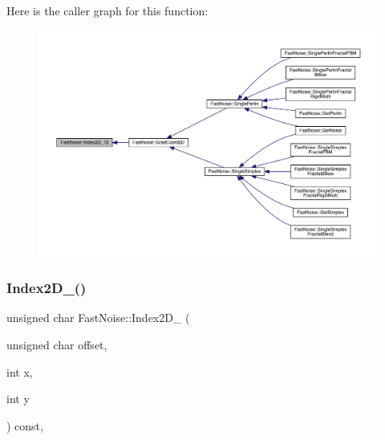 Here is the caller graph for this function\+:
\nopagebreak
\begin{figure}[H]
\begin{center}
\leavevmode
\includegraphics[width=350pt]{class_fast_noise_aa4cae648a6a3817d77dcd7439f711827_icgraph}
\end{center}
\end{figure}
\mbox{\label{class_fast_noise_aec59eb9f9bcdb06e6a7dbe5a3fdf7145}} 
\subsubsection{\texorpdfstring{Index2\+D\+\_()}{Index2D\_256()}}
{\footnotesize\ttfamily unsigned char Fast\+Noise\+::\+Index2\+D\+\_ (\begin{DoxyParamCaption}\item[{unsigned char}]{offset,  }\item[{int}]{x,  }\item[{int}]{y }\end{DoxyParamCaption}) const\hspace{0.3cm}{\ttfamily [inline]}, {\ttfamily [private]}}

